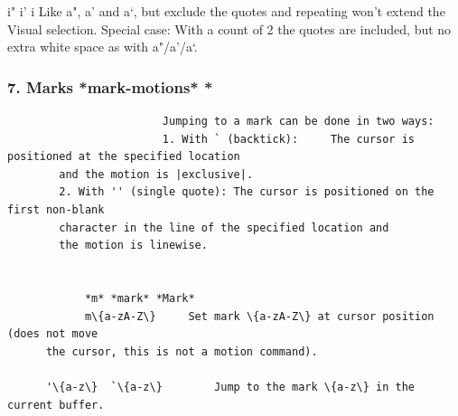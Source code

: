 \documentclass{beamer}
\begin{document}
\begin{frame}
                        i" i'   i
                        Like a", a' and a`, but exclude the quotes and
                        repeating won't extend the Visual selection.
                        Special case: With a count of 2 the quotes are
                        included, but no extra white space as with a"/a'/a`.


                      \end{frame}

\begin{frame}[fragile]
  \frametitle{7. Marks                  *mark-motions* *}

                        \begin{verbatim}
                        Jumping to a mark can be done in two ways:
                        1. With ` (backtick):     The cursor is positioned at the specified location
        and the motion is |exclusive|.
        2. With '' (single quote): The cursor is positioned on the first non-blank
        character in the line of the specified location and
        the motion is linewise.


            *m* *mark* *Mark*
            m\{a-zA-Z\}     Set mark \{a-zA-Z\} at cursor position (does not move
      the cursor, this is not a motion command).

      '\{a-z\}  `\{a-z\}        Jump to the mark \{a-z\} in the current buffer.



\end{verbatim}
\end{frame}
\end{document}

